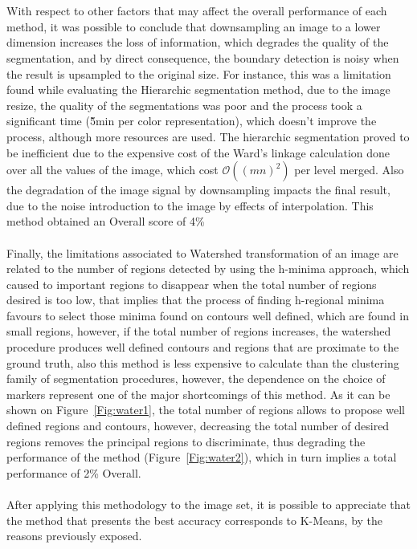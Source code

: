 \documentclass[10pt,twocolumn,letterpaper]{article}
\begin{document}
 \\
 \\
 With respect to other factors that may affect the overall performance of each method, it was possible to conclude that downsampling an image to a lower dimension increases the loss of information, which degrades the quality of the segmentation, and by direct consequence, the boundary detection is noisy when the result is upsampled to the original size. For instance, this was a limitation found while evaluating the Hierarchic segmentation method, due to the image resize, the quality of the segmentations was poor and the process took a significant time (\~ 5min per color representation), which doesn't improve the process, although more resources are used. The hierarchic segmentation proved to be inefficient due to the expensive cost of the Ward's linkage calculation done over all the values of the image, which cost $\mathcal{O}((mn)^2)$ per level merged. Also the degradation of the image signal by downsampling impacts the final result, due to the noise introduction to the image by effects of interpolation. This method obtained an Overall score of 4\%
 \\
 \\
 Finally, the limitations associated to Watershed transformation of an image are related to the number of regions detected by using the h-minima approach, which caused to important regions to disappear when the total number of regions desired is too low, that implies that the process of finding h-regional minima favours to select those minima found on contours well defined, which are found in small regions, however, if the total number of regions increases, the watershed procedure produces well defined contours and regions that are proximate to the ground truth, also this method is less expensive to calculate than the clustering family of segmentation procedures, however, the dependence on the choice of markers represent one of the major shortcomings of this method. As it can be shown on Figure~\ref{Fig:water1}, the total number of regions allows to propose well defined regions and contours, however, decreasing the total number of desired regions removes the principal regions to discriminate, thus degrading the performance of the method (Figure~\ref{Fig:water2}), which in turn implies a total performance of 2\% Overall.  
 \\
 \\
After applying this methodology to the image set, it is possible to appreciate that the method that presents the best accuracy corresponds to K-Means, by the reasons previously exposed.
\end{document}
